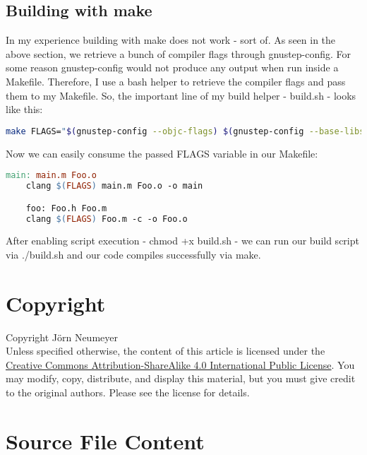 \documentclass{article}
\begin{document}
  \subsection{Building with make}
  In my experience building with make does not work - sort of.
  As seen in the above section, we retrieve a bunch of compiler flags through gnustep-config.
  For some reason gnustep-config would not produce any output when run inside a Makefile.
  Therefore, I use a bash helper to retrieve the compiler flags and pass them to my Makefile.
  So, the important line of my build helper - build.sh - looks like this:
  \newpage
  \begin{lstlisting}[language=bash]
    make FLAGS="$(gnustep-config --objc-flags) $(gnustep-config --base-libs)"
  \end{lstlisting}
  Now we can easily consume the passed FLAGS variable in our Makefile:
  \begin{lstlisting}[language=make]
    main: main.m Foo.o
    clang $(FLAGS) main.m Foo.o -o main

    foo: Foo.h Foo.m
    clang $(FLAGS) Foo.m -c -o Foo.o
  \end{lstlisting}
  After enabling script execution - chmod +x build.sh - we can run our build script via ./build.sh and our code compiles successfully via make.
  \section{Copyright}
  Copyright \textcopyright {} J\"orn Neumeyer\\
  Unless specified otherwise, the content of this article is licensed under the \href{https://creativecommons.org/licenses/by-sa/4.0/}{Creative Commons Attribution-ShareAlike 4.0 International Public License}.
  You may modify, copy, distribute, and display this material, but you must give credit to the original authors. Please see the license for details.

  \section{Source File Content}
  
  
  
\end{document}
